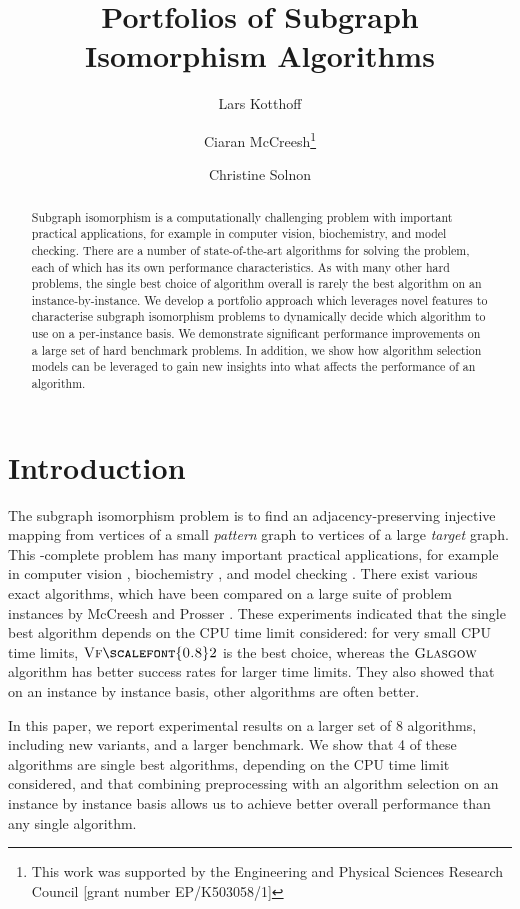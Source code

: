 \documentclass{llncs}
\title{Portfolios of Subgraph Isomorphism Algorithms}
\author{
    Lars Kotthoff\inst{1}
    \and Ciaran McCreesh\thanks{This work was supported by the Engineering
        and Physical Sciences Research Council [grant number EP/K503058/1]}\inst{2}
    \and Christine Solnon\inst{3}}
\institute{
    University of British Columbia, Vancouver, Canada
    \and University of Glasgow, Glasgow, Scotland
    \and INSA-Lyon, LIRIS, UMR5205, F-69621, France}
\newcommand{\VFtwo}{$\textsc{Vf{\scalefont{0.8}2}}$\xspace}
\newcommand{\Glasgow}{$\textsc{Glasgow}$\xspace}
\begin{document}
\maketitle

\begin{abstract}
Subgraph isomorphism is a computationally challenging problem with important practical
applications, for example in computer vision, biochemistry, and model checking. There are a number
of state-of-the-art algorithms for solving the problem, each of which has its own performance
characteristics. As with many other hard problems, the single best choice of algorithm overall is
rarely the best algorithm on an instance-by-instance. We develop a portfolio approach which leverages
novel features to characterise subgraph isomorphism problems to dynamically decide which algorithm
to use on a per-instance basis. We demonstrate significant performance improvements on a large set
of hard benchmark problems. In addition, we show how algorithm selection models can be leveraged to
gain new insights into what affects the performance of an algorithm.
\end{abstract}

\section{Introduction}

The subgraph isomorphism problem is to find an adjacency-preserving injective mapping from vertices
of a small \emph{pattern} graph to vertices of a large \emph{target} graph. This \NP-complete
problem has many important practical applications, for example in computer vision
\cite{cviu11,pr15}, biochemistry \cite{Giugno:2013}, and model checking \cite{Sevegnani:2015}. There
exist various exact algorithms, which have been compared on a large suite of problem instances by
McCreesh and Prosser \cite{McCreesh:2015}. These experiments indicated that the single best
algorithm depends on the CPU time limit considered: for very small CPU time limits, \VFtwo
\cite{Cordella:2004} is the best choice, whereas the \Glasgow algorithm \cite{McCreesh:2015} has
better success rates for larger time limits.  They also showed that on an instance by instance
basis, other algorithms are often better.

In this paper, we report experimental results on a larger set of 8 algorithms, including new
variants, and a larger benchmark. We show that 4 of these algorithms are single best algorithms,
depending on the CPU time limit considered, and that combining preprocessing with an algorithm
selection on an instance by instance basis allows us to achieve better overall performance than any
single algorithm.
\end{document}
